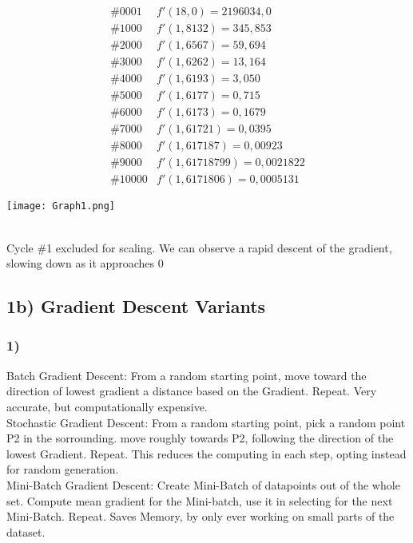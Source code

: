 \documentclass{article}
\begin{document}
		\begin{align*}
			\#0001 & f'(18,0) = 2196034,0\\
			\#1000 & f'( 1,8132) = 345,853\\
			\#2000 & f'( 1,6567) = 59,694\\
			\#3000 & f'( 1,6262) = 13,164\\
			\#4000 & f'( 1,6193) = 3,050\\
			\#5000 & f'( 1,6177) = 0,715\\
			\#6000 & f'( 1,6173) = 0,1679\\
			\#7000 & f'( 1,61721) = 0,0395\\
			\#8000 & f'( 1,617187) = 0,00923\\
			\#9000 & f'( 1,61718799) = 0,0021822\\
			\#10000 & f'(1,6171806) = 0,0005131
		\end{align*}
	\begin{minipage}{0.9\linewidth}
		\texttt{[image: Graph1.png]}
	\end{minipage}\\
	Cycle \#1 excluded for scaling. We can observe a rapid descent of the gradient, slowing down as it approaches 0

\subsection{1b) Gradient Descent Variants}
\subsubsection{1)}
	Batch Gradient Descent: From a random starting point, move toward the direction of lowest gradient a distance based on the Gradient. Repeat. Very accurate, but computationally expensive.\\
	Stochastic Gradient Descent: From a random starting point, pick a random point P2 in the sorrounding. move roughly towards P2, following the direction of the lowest Gradient. Repeat. This reduces the computing in each step, opting instead for random generation. \\
	Mini-Batch Gradient Descent: Create Mini-Batch of datapoints out of the whole set. Compute mean gradient for the Mini-batch, use it in selecting for the next Mini-Batch. Repeat. Saves Memory, by only ever working on small parts of the dataset.
	
\end{document}

